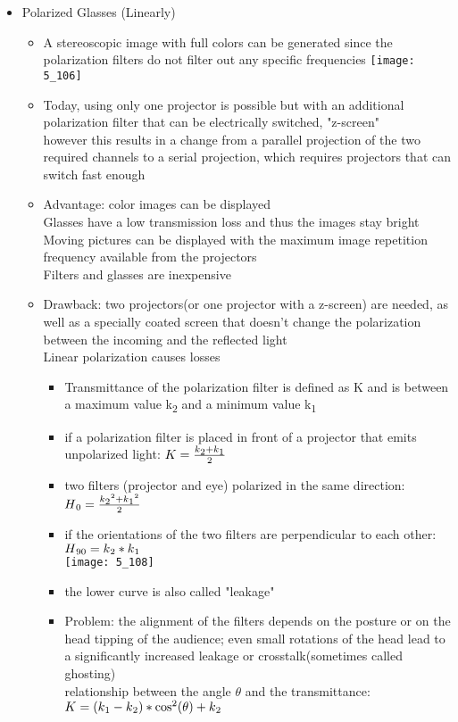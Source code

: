 \documentclass{standalone}
\begin{document}
\begin{itemize}
	\item Polarized Glasses (Linearly)
	\begin{itemize}
		\item A stereoscopic image with full colors can be generated since the polarization filters do not filter out any specific frequencies
		\texttt{[image: 5\_106]}
		\item Today, using only one projector is possible but with an additional polarization filter that can be electrically switched, "z-screen" \\
		however this results in a change from a parallel projection of the two required channels to a serial projection, which requires projectors that can switch fast enough
		\item Advantage: color images can be displayed \\
		Glasses have a low transmission loss and thus the images stay bright \\
		Moving pictures can be displayed with the maximum image repetition frequency available from the projectors \\
		Filters and glasses are inexpensive
		\item Drawback: two projectors(or one projector with a z-screen) are needed, as well as a specially coated screen that doesn't change the polarization between the incoming and the reflected light\\
		Linear polarization causes losses
		\begin{itemize}
			\item Transmittance of the polarization filter is defined as K and is between a maximum value k\textsubscript{2} and a minimum value  k\textsubscript{1}
			\item if a polarization filter is placed in front of a projector that emits unpolarized light: $ K = \frac{ k\textsubscript{2} + k\textsubscript{1}}{2} $
			\item two filters (projector and eye) polarized in the same direction: $ H\textsubscript{0} = \frac{ k\textsubscript{2}^2 + k\textsubscript{1}^2}{2} $
			\item if the orientations of the two filters are perpendicular to each other: $ H\textsubscript{90} = k\textsubscript{2}*k\textsubscript{1} $ \\
			\texttt{[image: 5\_108]}
			\item the lower curve is also called "leakage"
			\item Problem: the alignment of the filters depends on the posture or on the head tipping of the audience; even small rotations of the head lead to a significantly increased leakage or crosstalk(sometimes called ghosting) \\
			relationship between the angle $\theta$ and the transmittance: $ K = (k\textsubscript{1}-k\textsubscript{2})*\cos ^2(\theta)+k\textsubscript{2} $ \\
		\end{itemize}
	\end{itemize}
	

\end{itemize}
\end{document}
